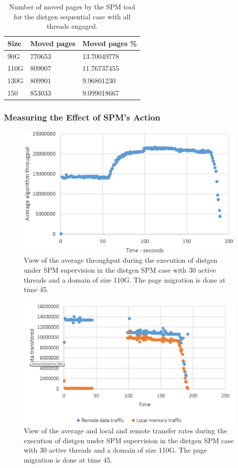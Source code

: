 \begin{table}[th]
	\centering
		\begin{tabularx}{.6\textwidth}{|l|l|X|}
		\hline
			Size & Moved pages & Moved pages \%  \\
			\hline
			90G & 770653 & 13.70049778 \\
			\hline
			110G & 809007 & 11.76737455 \\
			\hline
			130G & 809901 & 9.96801230 \\
			\hline
			150 & 853033 & 9.099018667 \\
			\hline
		\end{tabularx}
		\caption{Number of moved pages by the SPM tool for the distgen sequential case with all threads engaged.}
		\label{table:res-tbl-dgenmvdseqat}
\end{table}
\FloatBarrier
\subsubsection{Measuring the Effect of SPM's Action}\label{subsection:time-dgenat-action.eps}

\begin{figure}[th]
	\centering
		\includegraphics[width=.8\textwidth]{figures/at-thrput-random.eps}
		\caption{View of the average throughput during the execution of distgen under SPM supervision in the distgen SPM case with 30 active threads and a domain of size 110G. The page migration is done at time 45.}
		\label{fig:at-spmactn-thgput}
\end{figure}

\begin{figure}[th]
	\centering
		\includegraphics[width=.8\textwidth]{figures/at-transfer-random.eps}
		\caption{View of the average and local and remote transfer rates during the execution of distgen under SPM supervision in the distgen SPM case with 30 active threads and a domain of size 110G. The page migration is done at time 45.}
		\label{fig:at-spmactn-trsfer}
\end{figure}

